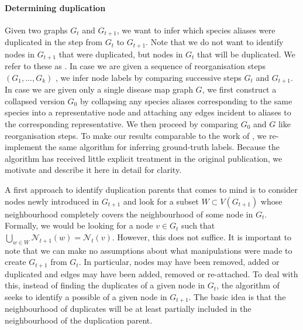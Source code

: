 \documentclass[
	fontsize=10pt, %
	twoside=true, %
	secnumdepth=1, %
  toc=indentunnumbered %
]{kaobook}
\begin{document}
\paragraph{Determining duplication} Given two graphs $G_t$ and $G_{t+1}$, we
want to infer which species aliases were duplicated in the step from $G_t$ to
$G_{t+1}$. Note that we do not want to identify nodes in $G_{t+1}$ that were
duplicated, but nodes in $G_t$ that will be duplicated. We refer to these as
. In case we are given a sequence of reorganisation
steps $(G_1, ..., G_k)$ , we infer node labels by comparing successive steps
$G_t$ and $G_{t+1}$. In
case we are given only a single disease map graph $G$, we first construct a collapsed
version $G_0$ by collapsing any species aliases
corresponding to the same species into a representative node and attaching any edges
incident to aliases to the corresponding representative. We then proceed by
comparing $G_0$ and $G$ like reorganisation steps.
%
To make our results comparable to the work of
\citeauthor{nielsen_MachineLearningSupport_2019}
\cite{nielsen_MachineLearningSupport_2019}, we re-implement the same algorithm
for inferring ground-truth labels. Because the algorithm has received little
explicit treatment in the original publication, we motivate and describe it here
in detail for clarity.
%

A first approach to identify duplication parents that comes to mind is to
consider nodes newly introduced in $G_{t+1}$ and look for a subset $W \subset
V(G_{t+1})$ whose neighbourhood completely covers the neighbourhood of some node
in $G_{t}$. Formally, we would be looking for a node $v \in G_t$ such that
$\bigcup_{w \in W} \mathcal{N}_{t+1}(w) = \mathcal{N}_t(v)$. However, this does
not suffice. It is important to note that we can make no assumptions about what
manipulations were made to create $G_{t+1}$ from $G_t$. In particular, nodes may
have been removed, added or duplicated and edges may have been added, removed or
re-attached.
%
To deal with this, instead of finding the duplicates of a given node in
$G_{t}$, the algorithm of \nielsen{}~\cite{nielsen_MachineLearningSupport_2019}
seeks to identify a possible  of
a given node in $G_{t+1}$. The basic idea is that the neighbourhood of
duplicates will be at least partially included in the neighbourhood of the
duplication parent.
\end{document}
